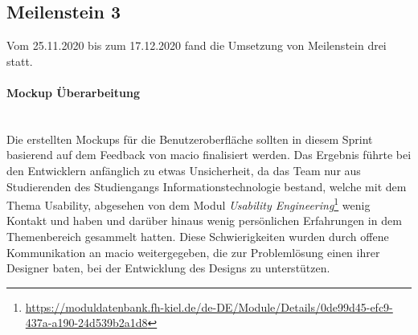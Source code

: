 \documentclass[10pt, a4paper]{article}
\begin{document}
\begin{onehalfspace}
\subsection{Meilenstein 3}
Vom 25.11.2020 bis zum 17.12.2020 fand die Umsetzung von Meilenstein drei statt.

\paragraph*{Mockup Überarbeitung} $~$ \\
Die erstellten Mockups für die Benutzeroberfläche sollten in diesem Sprint basierend auf dem Feedback von macio finalisiert werden.
Das Ergebnis führte bei den Entwicklern anfänglich zu etwas Unsicherheit, da das Team nur aus Studierenden des Studiengangs
Informationstechnologie bestand, welche mit dem Thema Usability, abgesehen von dem Modul
\textit{Usability Engineering}\footnote{\raggedright\url{https://moduldatenbank.fh-kiel.de/de-DE/Module/Details/0de99d45-efc9-437a-a190-24d539b2a1d8}}
wenig Kontakt und haben und darüber hinaus wenig persönlichen Erfahrungen in dem Themenbereich gesammelt hatten.
Diese Schwierigkeiten wurden durch offene Kommunikation an macio weitergegeben, die zur Problemlösung einen ihrer Designer baten,
bei der Entwicklung des Designs zu unterstützen.


\end{onehalfspace}
\end{document}
